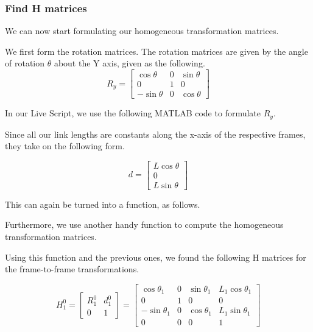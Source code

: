 \documentclass[conference]{IEEEtran}
\begin{document}
\subsubsection{Find H matrices}
We can now start formulating our homogeneous transformation matrices.

We first form the rotation matrices. The rotation matrices are given by
the angle of rotation $\theta$ about the Y axis, given as the following.
\begin{equation*}
    R_y =
    \begin{bmatrix}
         \cos\theta  & 0 & \sin\theta\\
         0 & 1 & 0\\
         -\sin\theta & 0 & \cos\theta
    \end{bmatrix}
\end{equation*}

In our Live Script, we use the following MATLAB code to formulate $R_y$.



Since all our link lengths are constants along the x-axis of the
respective frames, they take on the following form.

\begin{equation*}
    d = \begin{bmatrix}
        L \cos\theta\\0\\L\sin\theta
    \end{bmatrix}
\end{equation*}

This can again be turned into a function, as follows.



Furthermore, we use another handy function to compute the homogeneous
transformation matrices.



Using this function and the previous ones,
we found the following H matrices for the frame-to-frame transformations.

\[
    H^0_1 = \begin{bmatrix}
        R^0_1 & d^0_1\\
        0 & 1
    \end{bmatrix}
    =
    \begin{bmatrix}
        \cos\theta _{1} & 0 & \sin\theta _{1} & L_{1} \cos\theta_1\\
        0 & 1 & 0 & 0\\
        -\sin\theta _{1} & 0 & \cos\theta_{1} & L_1 \sin\theta_1\\
        0 & 0 & 0 & 1
    \end{bmatrix}
\]
\end{document}
